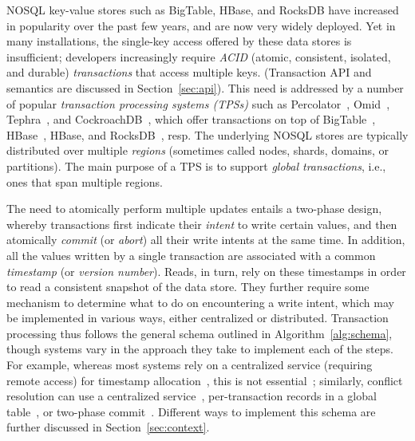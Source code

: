 
NOSQL key-value stores such as BigTable, HBase, and RocksDB have increased in popularity over the past few years, and are now very widely deployed. Yet in many installations, the single-key access offered by these data stores is insufficient; developers  increasingly require 
 \emph{ACID} (atomic, consistent, isolated, and durable) \emph{transactions} that access multiple keys.
 (Transaction API and semantics are discussed in Section~\ref{sec:api}).
This need is addressed by a number of popular  \emph{transaction processing systems (TPSs)} 
such as  Percolator~\cite{Percolator2010}, Omid~\cite{OmidICDE2014,omid-blog}, Tephra~\cite{tephra}, and CockroachDB~\cite{cockroach}, 
which offer transactions on top of  BigTable~\cite{bigtable-osdi06}, HBase~\cite{hbase}, HBase, and RocksDB~\cite{rocksdb}, resp. 
The underlying NOSQL stores are typically distributed  over multiple \emph{regions} (sometimes called nodes, shards, domains, or partitions).
The main purpose of a TPS is to support \emph{global transactions}, i.e., ones that span multiple regions.

The need to atomically perform multiple  updates  entails a two-phase design, whereby transactions first indicate their \emph{intent} to write certain values, and then atomically \emph{commit} (or \emph{abort}) all their write intents at the same time. In addition, 
all the values written by a single transaction are associated with a common  \emph{timestamp} (or \emph{version number}). 
Reads, in turn, rely on these timestamps in order to read a consistent snapshot of the data store. They further  
require some mechanism to determine what to do on encountering a write intent, which may be implemented in
various ways, either centralized or distributed.
Transaction processing thus follows the general schema outlined in Algorithm~\ref{alg:schema}, 
though systems vary in the approach they take to implement each of the steps. 
For example, whereas most systems rely on a centralized service (requiring remote access) for timestamp allocation~\cite{OmidICDE2014,omid-blog,tephra,Percolator2010}, this is not essential~\cite{cockroach}; similarly, conflict resolution can use a centralized service~\cite{OmidICDE2014,omid-blog,tephra}, per-transaction records in a global table~\cite{cockroach}, or two-phase commit~\cite{Percolator2010}. Different ways to implement this schema are further discussed in Section~\ref{sec:context}.
 

